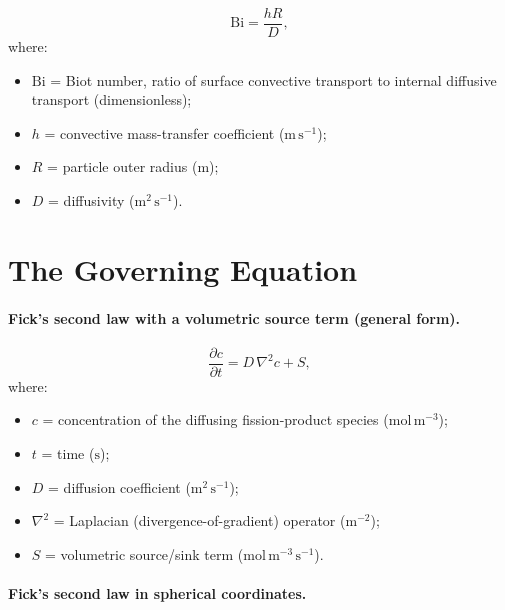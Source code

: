 \documentclass[11pt,a4paper]{article}
\newcommand{\conc}{c}
\newcommand{\pd}[2]{\frac{\partial #1}{\partial #2}}
\newcommand{\Lap}{\nabla^{2}}
\newcommand{\Diff}{D}
\newcommand{\Bi}{\mathrm{Bi}}
\begin{document}
\begin{equation}
\Bi = \frac{hR}{D},
\label{eq:b:biot}
\end{equation}
\vspace{-0.3em}
\noindent where:

\begin{itemize}[leftmargin=1.6em,itemsep=1pt,topsep=3pt,parsep=0pt]
  \item $\mathrm{Bi}$ = Biot number, ratio of surface convective transport to internal diffusive transport (dimensionless);
  \item $h$ = convective mass-transfer coefficient ($\mathrm{m\,s^{-1}}$);
  \item $R$ = particle outer radius ($\mathrm{m}$);
  \item $D$ = diffusivity ($\mathrm{m^{2}\,s^{-1}}$).
\end{itemize}
\clearpage

\section{The Governing Equation}
\label{sec:governing-equation}


\paragraph{Fick's second law with a volumetric source term (general form).}

\begin{equation}
  \pd{\conc}{t} = \Diff \, \Lap \conc + S ,
  \label{eq:fick}
\end{equation}
\vspace{-0.3em}
\noindent where:

\begin{itemize}[leftmargin=1.6em,itemsep=1pt,topsep=3pt,parsep=0pt]
  \item $c$ = concentration of the diffusing fission-product species ($\mathrm{mol\,m^{-3}}$);
  \item $t$ = time ($\mathrm{s}$);
  \item $D$ = diffusion coefficient ($\mathrm{m^{2}\,s^{-1}}$);
  \item $\nabla^{2}$ = Laplacian (divergence-of-gradient) operator ($\mathrm{m^{-2}}$);
  \item $S$ = volumetric source/sink term ($\mathrm{mol\,m^{-3}\,s^{-1}}$).
\end{itemize}



\paragraph{Fick's second law in spherical coordinates.}
\end{document}
